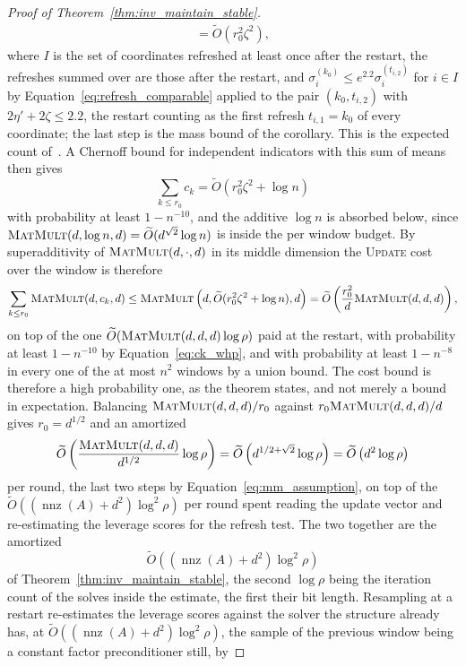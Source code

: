 \documentclass[11pt]{article}
\newcommand{\nnz}{\operatorname{nnz}}
\newcommand{\MM}{\textsc{MatMult}}
\renewcommand{\O}{\widetilde O}
\begin{document}
\begin{proof}[Proof of Theorem~\ref{thm:inv_maintain_stable}]
\begin{align*}
=
\O\left( r_0^{2} \zeta^{2} \right) ,
\end{align*}
where $I$ is the set of coordinates refreshed at least once after the restart,
the refreshes summed over are those after the restart, and
$\sigma^{(k_0)}_i \le e^{2.2} \sigma^{(t_{i, 2})}_i$ for
$i \in I$ by Equation~\eqref{eq:refresh_comparable} applied to the pair
$(k_0, t_{i, 2})$ with
$2 \eta' + 2 \zeta \le 2.2$, the restart counting as the first refresh
$t_{i, 1} = k_0$ of every coordinate; the last step is the mass bound of the
corollary.
This is the expected count of~\cite[Lemma 15]{LS15}.
A Chernoff bound for independent indicators with this sum of means then gives
\begin{equation}
\label{eq:ck_whp}
\sum_{k \le r_0} c_k
=
\O\left( r_0^2 \zeta^2 + \log n \right)
\end{equation}
with probability at least $1 - n^{-10}$, and the additive
$\log n$ is absorbed below, since
$\MM(d, \log n, d) = \O(d^{\sqrt{2}} \log n)$ is inside the per window budget.
By superadditivity of $\MM(d, \cdot, d)$ in its middle dimension the
\textsc{Update} cost over the window is therefore
\[
\sum_{k \le r_0} \MM(d, c_k, d)
\le
\MM\left( d, \O(r_0^{2} \zeta^{2} + \log n), d \right)
=
\O\left( \frac{r_0^{2}}{d} \MM(d, d, d) \right),
\]
on top of the one $\O(\MM(d, d, d) \log \rho)$ paid at the restart, with
probability at least $1 - n^{-10}$ by Equation~\eqref{eq:ck_whp}, and with
probability at least $1 - n^{-8}$ in every one of the at most
$n^{2}$ windows by a union bound.
The cost bound is therefore a high probability one, as the theorem states, and
not merely a bound in expectation.
Balancing $\MM(d, d, d) / r_0$ against
$r_0 \MM(d, d, d) / d$ gives
$r_0 = d^{1/2}$ and an amortized
\[
\O\left( \frac{\MM(d, d, d)}{d^{1/2}} \log \rho \right)
=
\O\left( d^{1/2 + \sqrt{2}} \log \rho \right)
=
\O\left( d^{2} \log \rho \right)
\]
per round, the last two steps by Equation~\eqref{eq:mm_assumption}, on top of
the $\O((\nnz(A) + d^{2}) \log^{2} \rho)$ per round spent reading the update
vector and re-estimating the leverage scores for the refresh test.
The two together are the amortized
\[
\O\left( \left( \nnz(A) + d^{2} \right) \log^{2} \rho \right)
\]
of Theorem~\ref{thm:inv_maintain_stable}, the second $\log \rho$ being the
iteration count of the solves inside the estimate, the first their bit length.
Resampling at a restart re-estimates the leverage scores against the solver the
structure already has, at $\O((\nnz(A) + d^{2}) \log^{2} \rho)$, the sample of
the previous window being a constant factor preconditioner still, by

\end{proof}
\end{document}
